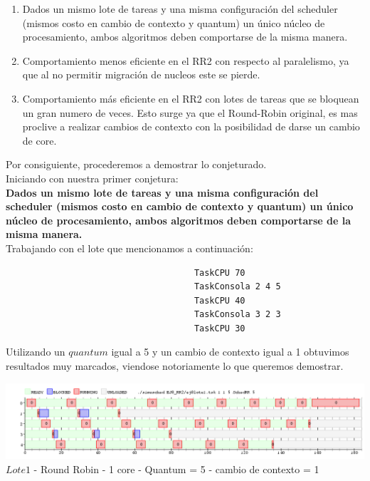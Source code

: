 \begin{enumerate}
 \item Dados un mismo lote de tareas y una misma configuración del scheduler (mismos costo en cambio
de contexto y quantum) un único núcleo de procesamiento, ambos algoritmos deben comportarse
de la misma manera.
\item Comportamiento menos eficiente en el RR2 con respecto al paralelismo, ya que al no permitir
migración de nucleos este se pierde.
\item Comportamiento más eficiente en el RR2 con lotes de tareas que se bloquean un gran numero
de veces. Esto surge ya que el Round-Robin original, es mas proclive a realizar cambios de contexto con la posibilidad
de darse un cambio de core.
\end{enumerate}

Por consiguiente, procederemos a demostrar lo conjeturado.\\

Iniciando con nuestra primer conjetura:\\

\textbf{Dados un mismo lote de tareas y una misma configuración del scheduler 
 (mismos costo en cambio de contexto y quantum)
un único núcleo de procesamiento, ambos algoritmos deben comportarse
de la misma manera.}\\

Trabajando con el lote que mencionamos a continuación:
    
    \begin{verbatim}
                                     TaskCPU 70
                                     TaskConsola 2 4 5
                                     TaskCPU 40
                                     TaskConsola 3 2 3
                                     TaskCPU 30
    \end{verbatim}

Utilizando un $quantum$ igual a 5 y un cambio de contexto igual a 1 obtuvimos 
resultados muy marcados, viendose notoriamente lo que queremos demostrar.\\

\begin{center}
    	\includegraphics[width=450pt]{./EJ8_RR2/dif1corerr.png}
	{$Lote 1$ - Round Robin - 1 core - Quantum = 5 - cambio de contexto = 1}	
 \end{center}
 
